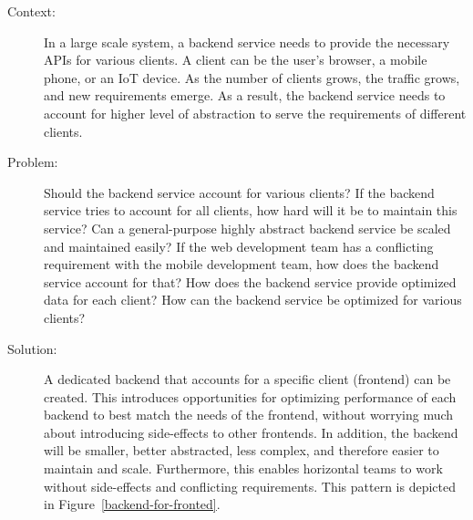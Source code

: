 \documentclass{bmcart}
\begin{document}
\begin{description}
  \item[Context:] In a large scale system, a backend service needs to provide the necessary APIs for various clients. A client can be the user's browser, a mobile phone, or an IoT device. As the number of clients grows, the traffic grows, and new requirements emerge. As a result, the backend service needs to account for higher level of abstraction to serve the requirements of different clients. 
  \item[Problem:] Should the backend service account for various clients? If the backend service tries to account for all clients, how hard will it be to maintain this service? Can a general-purpose highly abstract backend service be scaled and maintained easily? If the web development team has a conflicting requirement with the mobile development team, how does the backend service account for that? How does the backend service provide optimized data for each client? How can the backend service be optimized for various clients? 
  \item[Solution:] A dedicated backend that accounts for a specific client (frontend) can be created. This introduces opportunities for optimizing performance of each backend to best match the needs of the frontend, without worrying much about introducing side-effects to other frontends. In addition, the backend will be smaller, better abstracted, less complex, and therefore easier to maintain and scale. Furthermore, this enables horizontal teams to work without side-effects and conflicting requirements. This pattern is depicted in Figure~\ref{backend-for-fronted}.      
\end{description}



\end{document}
